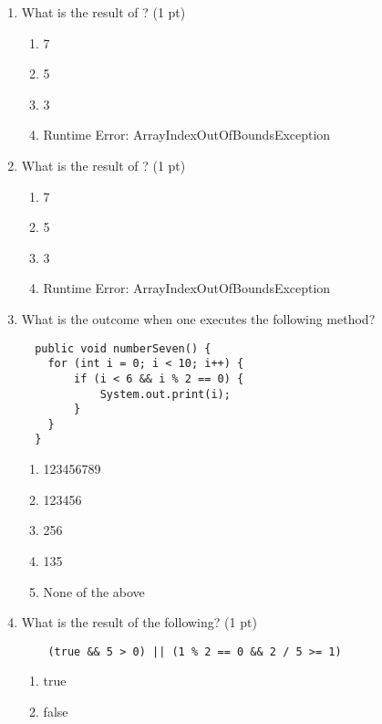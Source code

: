 \documentclass[11pt,fleqn]{article}
\begin{document}
\begin{enumerate}
  \textbf{Questions 5-6 refer to the following 2D array:}
  \begin{verbatim}
  int[][] myArray = new int[] {
		    new int[]{2, 5, 9, 10},
		    new int[]{1, 2, 3, 4, 5}
  };
	\end{verbatim}

\item What is the result of ? (1 pt)
	\begin{enumerate}
	\item 7
	\item 5
	\item 3
	\item Runtime Error: ArrayIndexOutOfBoundsException
	\end{enumerate}

\item What is the result of ? (1 pt)
	\begin{enumerate}
	\item 7
	\item 5
	\item 3
	\item Runtime Error: ArrayIndexOutOfBoundsException
	\end{enumerate}

\item What is the outcome when one executes the following method?
	\begin{verbatim}
  public void numberSeven() {
  	for (int i = 0; i < 10; i++) {
  		if (i < 6 && i % 2 == 0) {
  			System.out.print(i);
  		}
  	}
  }
	\end{verbatim}
	\begin{enumerate}
	\item 123456789
	\item 123456
	\item 256
	\item 135
	\item None of the above
	\end{enumerate}

\item What is the result of the following? (1 pt)
	\begin{verbatim}
    (true && 5 > 0) || (1 % 2 == 0 && 2 / 5 >= 1)
    \end{verbatim}
	\begin{enumerate}
	\item true
	\item false
	\end{enumerate}


\end{enumerate}
\end{document}
